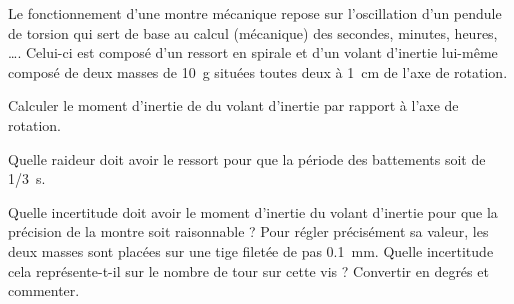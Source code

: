 

Le fonctionnement d'une montre mécanique repose sur l'oscillation d'un pendule de torsion qui sert de base au calcul (mécanique) des secondes, minutes, heures, \dots. Celui-ci est composé d'un ressort en spirale et d'un volant d'inertie lui-même composé de deux masses de \SI{10}{g} situées toutes deux à \SI{1}{cm} de l'axe de rotation.

\question Calculer le moment d'inertie de du volant d'inertie par rapport à l'axe de rotation.

\question Quelle raideur doit avoir le ressort pour que la période des battements soit de \SI{1/3}{s}.

\question \subquestion Quelle incertitude doit avoir le moment d'inertie du volant d'inertie pour que la précision de la montre soit raisonnable ?
\subquestion Pour régler précisément sa valeur, les deux masses sont placées sur une tige filetée de pas \SI{0.1}{mm}. Quelle incertitude cela représente-t-il sur le nombre de tour sur cette vis ? Convertir en degrés et commenter.
